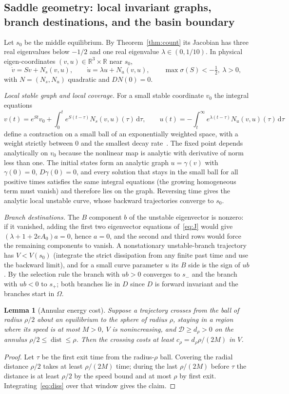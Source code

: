 \documentclass[11pt,a4paper]{article}
\theoremstyle{plain}
\newtheorem{lemma}[theorem]{Lemma}
\theoremstyle{definition}
\theoremstyle{remark}
\newcommand{\R}{\mathbb{R}}
\newcommand{\D}{\mathcal{D}}
\newcommand{\dd}{\,\mathrm{d}}
\DeclareMathOperator{\dist}{dist}
\begin{document}
\subsection{Saddle geometry: local invariant graphs, branch destinations, and the basin boundary}\label{sec:geometry}

Let $s_0$ be the middle equilibrium. By Theorem~\ref{thm:count} its Jacobian has three real eigenvalues below $-1/2$ and one real eigenvalue $\lambda\in(0,1/10)$. In physical eigen-coordinates $(v,u)\in\R^3\times\R$ near $s_0$,
\[
\dot v=Sv+N_s(v,u),\qquad \dot u=\lambda u+N_u(v,u),\qquad \max\sigma(S)<-\tfrac12,\ \lambda>0,
\]
with $N=(N_s,N_u)$ quadratic and $DN(0)=0$.

\emph{Local stable graph and local coverage.} For a small stable coordinate $v_0$ the integral equations
\[
v(t)=e^{St}v_0+\int_0^te^{S(t-\tau)}N_s(v,u)(\tau)\dd\tau,\qquad
u(t)=-\int_t^\infty e^{\lambda(t-\tau)}N_u(v,u)(\tau)\dd\tau
\]
define a contraction on a small ball of an exponentially weighted space, with a weight strictly between $0$ and the smallest decay rate~\cite[Section~2.7]{perko2001}. The fixed point depends analytically on $v_0$ because the nonlinear map is analytic with derivative of norm less than one. The initial states form an analytic graph $u=\gamma(v)$ with $\gamma(0)=0$, $D\gamma(0)=0$, and every solution that stays in the small ball for all positive times satisfies the same integral equations (the growing homogeneous term must vanish) and therefore lies on the graph. Reversing time gives the analytic local unstable curve, whose backward trajectories converge to $s_0$.

\emph{Branch destinations.} The $B$ component $b$ of the unstable eigenvector is nonzero: if it vanished, adding the first two eigenvector equations of~\eqref{eq:J} would give $(\lambda+1+2eA_0)a=0$, hence $a=0$, and the second and third rows would force the remaining components to vanish. A nonstationary unstable-branch trajectory has $V<V(s_0)$ (integrate the strict dissipation from any finite past time and use the backward limit), and for a small curve parameter $u$ its $B$ side is the sign of $ub$. By the selection rule the branch with $ub>0$ converges to $s_-$ and the branch with $ub<0$ to $s_+$; both branches lie in $D$ since $D$ is forward invariant and the branches start in $\Omega$.

\begin{lemma}[Annular energy cost]\label{lem:annulus}
Suppose a trajectory crosses from the ball of radius $\rho/2$ about an equilibrium to the sphere of radius $\rho$, staying in a region where its speed is at most $M>0$, $V$ is nonincreasing, and $\D\ge d_\rho>0$ on the annulus $\rho/2\le\dist\le\rho$. Then the crossing costs at least $c_\rho=d_\rho\rho/(2M)$ in $V$.
\end{lemma}
\begin{proof}
Let $\tau$ be the first exit time from the radius-$\rho$ ball. Covering the radial distance $\rho/2$ takes at least $\rho/(2M)$ time; during the last $\rho/(2M)$ before $\tau$ the distance is at least $\rho/2$ by the speed bound and at most $\rho$ by first exit. Integrating~\eqref{eq:diss} over that window gives the claim.
\end{proof}
\end{document}
